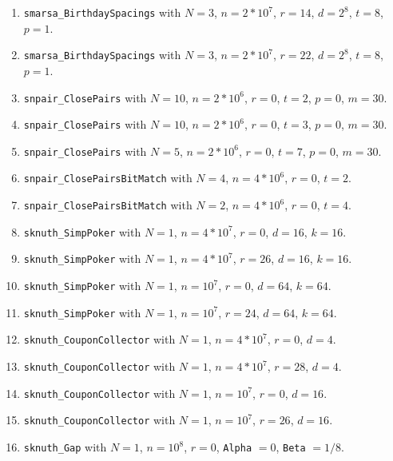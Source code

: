 \begin{enumerate}
  \item {\tt smarsa\_BirthdaySpacings}  with $N=3$,  $n=2*10^7$, $r=14$,
   $d = 2^{8}$, $t=8$, $p=1$.

  \item {\tt smarsa\_BirthdaySpacings}  with $N=3$,  $n=2*10^7$, $r=22$,
   $d = 2^{8}$, $t=8$, $p=1$.

  \item {\tt snpair\_ClosePairs}  with $N=10$,  $n=2*10^6$, $r=0$, $t=2$,
   $p=0$,  $m=30$.

  \item {\tt snpair\_ClosePairs}  with $N=10$,  $n=2*10^6$, $r=0$, $t=3$,
   $p=0$,  $m=30$.

  \item {\tt snpair\_ClosePairs}  with $N=5$,  $n=2*10^6$, $r=0$, $t=7$,
   $p=0$,  $m=30$.

  \item {\tt snpair\_ClosePairsBitMatch}  with $N=4$,  $n=4*10^6$,
   $r=0$, $t=2$.

  \item {\tt snpair\_ClosePairsBitMatch}  with $N=2$,  $n=4*10^6$,
   $r=0$, $t=4$.

  \item {\tt sknuth\_SimpPoker} with $N=1$,  $n=4*10^7$,  $r=0$, $d=16$, $k=16$.

  \item {\tt sknuth\_SimpPoker} with $N=1$,  $n=4*10^7$,  $r=26$, $d=16$, $k=16$.

  \item {\tt sknuth\_SimpPoker} with $N=1$,  $n=10^7$,  $r=0$, $d=64$, $k=64$.

  \item {\tt sknuth\_SimpPoker} with $N=1$,  $n=10^7$,  $r=24$, $d=64$, $k=64$.

  \item {\tt sknuth\_CouponCollector} with $N=1$, $n=4*10^7$, $r=0$, $d=4$.

  \item {\tt sknuth\_CouponCollector} with $N=1$, $n=4*10^7$, $r=28$, $d=4$.

  \item {\tt sknuth\_CouponCollector} with $N=1$, $n=10^7$, $r=0$, $d=16$.

  \item {\tt sknuth\_CouponCollector} with $N=1$, $n=10^7$, $r=26$, $d=16$.

  \item {\tt sknuth\_Gap} with $N=1$, $n=10^8$, $r=0$, {\tt Alpha} $=0$,
    {\tt Beta} $=1/8$.


\end{enumerate}
